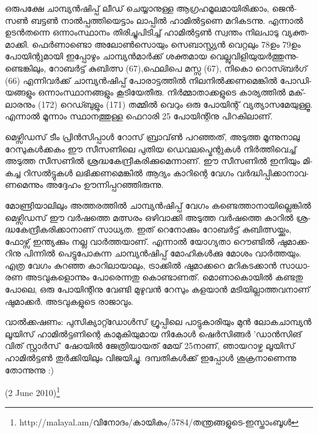 ഒ­രു­പ­ക്ഷേ ചാ­മ്പ്യന്‍­ഷി­പ്പ് ലീ­ഡ് ചെ­യ്യാ­നു­ള്ള ആഗ്ര­ഹ­മൂ­ല­മാ­യി­രി­ക്കാം, ജെന്‍­സണ്‍ ബട്ടണ്‍ നാല്‍­പ്പ­ത്തി­യെ­ട്ടാം ലാ­പ്പില്‍ 
ഹാ­മില്‍­ട്ട­ണെ മറി­ക­ട­ന്നു. എന്നാല്‍ ഉടന്‍­ത­ന്നെ ഒന്നാം­സ്ഥാ­നം തി­രി­ച്ചു­പി­ടി­ച്ച് ഹാ­മില്‍­ട്ടണ്‍ സ്വ­ന്തം നി­ല­പാ­ടു വ്യ­ക്ത­മാ­ക്കി.
ഫെര്‍­ണാ­ണ്ടൊ അലോണ്‍­സൊ­യും സെ­ബാ­സ്റ്റ്യന്‍ വെ­റ്റ­ലും 78ഉം 79ഉം പോ­യി­ന്റു­മാ­യി ഇപ്പോ­ഴും ചാ­മ്പ്യന്‍­മാര്‍­ക്ക് 
ശക്ത­മായ വെ­ല്ലു­വി­ളി­യു­യര്‍­ത്തു­ന്നു­ണ്ടെ­ങ്കി­ലും, റോ­ബര്‍­ട്ട് കു­ബി­ത്സ (67),­ഫെ­ലി­പെ മസ്സ (67), നി­കൊ റൊ­സ്ബര്‍­ഗ് (66)
എന്നി­വര്‍­ക്ക് ചാ­മ്പ്യന്‍­ഷി­പ്പ് പോ­രാ­ട്ട­ത്തില്‍ നി­ല­നില്‍­ക്ക­ണ­മെ­ങ്കില്‍ പോ­ഡി­യ­ങ്ങ­ളും ഒന്നാം­സ്ഥാ­ന­ങ്ങ­ളും കൂ­ടി­യേ­തീ­രു. 
നിര്‍­മ്മാ­താ­ക്ക­ളു­ടെ കാ­ര്യ­ത്തില്‍ മക്‌­ലാ­ര­നും ­(172) റെ­ഡ്ബു­ളും ­(171) തമ്മില്‍ വെ­റും ഒരു പോ­യി­ന്റ് വ്യ­ത്യാ­സ­മേ­യു­ള്ളൂ.
എന്നാല്‍ മൂ­ന്നാം സ്ഥാ­ന­ത്തു­ള്ള ­ഫെ­റാ­രി­ 25 പോ­യി­ന്റി­നു പി­റ­കി­ലാ­ണ്.

­മെ­ഴ്സി­ഡ­സ് ടീം പ്രിന്‍­സി­പ്പാള്‍ റോ­സ് ബ്രാ­വ്‌ണ്‍ പറ­ഞ്ഞ­ത്, അടു­ത്ത മൂ­ന്നു­നാ­ലു റേ­സു­കള്‍­ക്ക­കം ഈ സീ­സ­ണി­ലെ പു­തിയ
ഡെ­വ­ല­പ്മെ­ന്റു­കള്‍ നിര്‍­ത്തി­വെ­ച്ച് അടു­ത്ത സീ­സ­ണില്‍ ശ്ര­ദ്ധ­കേ­ന്ദ്രീ­ക­രി­ക്കു­മെ­ന്നാ­ണ്. ഈ സീ­സ­ണില്‍ ഇനി­യും മി­ക­ച്ച 
റി­സല്‍­ട്ടു­കള്‍ ലഭി­ക്ക­ണ­മെ­ങ്കില്‍ ആദ്യം കാ­റി­ന്റെ വേ­ഗം വര്‍­ദ്ധി­പ്പി­ക്കാ­നാ­വ­ണ­മെ­ന്നും അദ്ദേ­ഹം ഊന്നി­പ്പ­റ­ഞ്ഞി­രു­ന്നു­.

­മോ­ണ്ട്രി­യാ­ലി­ലും അത്ത­ര­ത്തില്‍ ചാ­മ്പ്യന്‍­ഷി­പ്പ് വേ­ഗം കണ്ടെ­ത്താ­നാ­യി­ല്ലെ­ങ്കില്‍ മെ­ഴ്സി­ഡ­സ് ഈ വര്‍­ഷ­ത്തെ മത്സ­രം 
ഒഴി­വാ­ക്കി അടു­ത്ത വര്‍­ഷ­ത്തെ കാ­റില്‍ ശ്ര­ദ്ധ­കേ­ന്ദ്രീ­ക­രി­ക്കാ­നാ­ണ് സാ­ധ്യ­ത. ഇത് റെ­നോ­ക്കും റോ­ബര്‍­ട്ട് കു­ബി­ത്സ­യ്ക്കും, 
ഫോ­ഴ്സ് ഇന്ത്യ­ക്കും നല്ല വാര്‍­ത്ത­യാ­ണ്. എന്നാല്‍ യോ­ഗ്യ­താ റൌ­ണ്ടില്‍ ഷു­മാ­ക്ക­റി­നു പി­ന്നില്‍ പെ­ട്ടു­പോ­കു­ന്ന 
ചാ­മ്പ്യന്‍­ഷി­പ്പ് മോ­ഹി­കള്‍­ക്കു മോ­ശം വാര്‍­ത്ത­യും. എത്ര വേ­ഗം കു­റ­ഞ്ഞ കാ­റി­ലാ­യാ­ലും, ട്രാ­ക്കില്‍ ഷു­മാ­ക്ക­റെ മറി­ക­ട­ക്കാന്‍
സാ­ധാ­രണ അട­വു­ക­ളൊ­ന്നും പോ­രെ­ന്ന­തു കൊ­ണ്ടാ­ണ­ത്. മൊ­ണാ­കൊ­യില്‍ കണ്ട­തു പോ­ലെ, ഒരു പോ­യി­ന്റി­നു വേ­ണ്ടി 
മു­ഴു­വന്‍ റേ­സും കള­യാന്‍ മടി­യി­ല്ലാ­ത്ത­വ­നാ­ണ് ഷു­മാ­ക്കര്‍. അട­വു­ക­ളു­ടെ രാ­ജാ­വും­.

­വാല്‍­ക്ക­ഷ­ണം­: പു­സി­ക്യാ­റ്റ്ഡോള്‍­സ് ഗ്രൂ­പ്പി­ലെ പാ­ട്ടു­കാ­രി­യും മുന്‍ ലോ­ക­ചാ­മ്പ്യന്‍ ലൂ­യി­സ് ഹാ­മില്‍­ട്ട­ണി­ന്റെ 
കാ­മു­കി­യു­മായ ­നി­കോള്‍ ഷെര്‍­സി­ങ്ങര്‍ 'ഡാന്‍­സി­ങ് വി­ത് സ്റ്റാര്‍­സ്' ഷോ­യില്‍ ജേ­ത്രി­യാ­യ­ത് മേ­യ് 25­നാ­ണ്, 
ഞാ­യ­റാ­ഴ്ച ലൂ­യി­സ് ഹാ­മില്‍­ട്ടണ്‍ തുര്‍­ക്കി­യി­ലും വി­ജ­യി­ച്ചു. ദമ്പ­തി­കള്‍­ക്ക് ഇപ്പോള്‍ ശു­ക്ര­നാ­ണെ­ന്നു തോ­ന്നു­ന്നു :)

(2 June 2010)\footnote{http://malayal.am/വിനോദം/കായികം/5784/തന്ത്രങ്ങളുടെ-ഇസ്താംബൂള്‍}

\newpage
